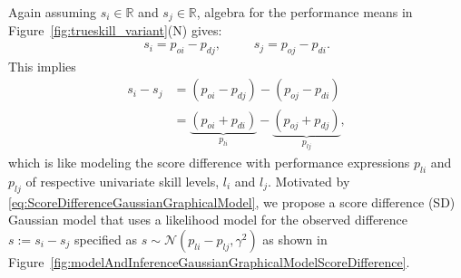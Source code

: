 \documentclass[runningheads,a4paper]{llncs}
\newcommand{\unindent}{\hspace{-1mm}}
\begin{document}
Again assuming $s_i \in \mathbb{R}$ and $s_j \in \mathbb{R}$,
algebra for the performance means in %
Figure~\ref{fig:trueskill_variant}(N) gives:
{\small\begin{align}
s_i = p_{oi}-p_{dj}, \qquad \;\; s_j = p_{oj}-p_{di}.
\label{eq:ScoreDifferenceGaussianGraphicalModel}
\end{align}}
This implies
{\small\begin{align}
  s_i - s_j &= (p_{oi} - p_{dj}) - (p_{oj} - p_{di})  \nonumber \\
            &= \underbrace{(p_{oi}+p_{di})}_{p_{li}} - \underbrace{(p_{oj}+p_{dj})}_{p_{lj}},
\end{align}}
\unindent which is like modeling the score difference with performance
expressions $p_{li}$ and $p_{lj}$ of respective univariate skill levels, $l_i$
and $l_j$.  Motivated by
\eqref{eq:ScoreDifferenceGaussianGraphicalModel}, we propose a score
difference (SD) Gaussian model that uses a likelihood model for the
observed difference $s := s_i - s_j$ specified as $s \sim
\mathcal{N}(p_{li} - p_{lj}, \gamma^2)$ as shown in
Figure~\ref{fig:modelAndInferenceGaussianGraphicalModelScoreDifference}.
\end{document}
